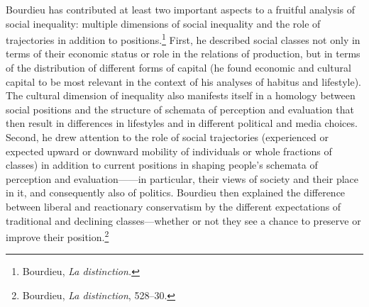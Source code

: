 \documentclass{tufte-handout}
\begin{document}
Bourdieu has contributed at least two important aspects to a fruitful
analysis of social inequality: multiple dimensions of social inequality
and the role of trajectories in addition to positions.\footnote{Bourdieu,
  \emph{La distinction.}} First, he described social classes not only in
terms of their economic status or role in the relations of production,
but in terms of the distribution of different forms of capital (he found
economic and cultural capital to be most relevant in the context of his
analyses of habitus and lifestyle). The cultural dimension of inequality
also manifests itself in a homology between social positions and the
structure of schemata of perception and evaluation that then result in
differences in lifestyles and in different political and media choices.
Second, he drew attention to the role of social trajectories
(experienced or expected upward or downward mobility of individuals or
whole fractions of classes) in addition to current positions in shaping
people's schemata of perception and evaluation------in particular, their
views of society and their place in it, and consequently also of
politics. Bourdieu then explained the difference between liberal and
reactionary conservatism by the different expectations of traditional
and declining classes---whether or not they see a chance to preserve or
improve their position.\footnote{Bourdieu, \emph{La distinction},
  528--30.}
\end{document}
